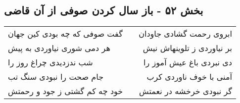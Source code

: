 \begin{center}
\section*{بخش ۵۲ - باز سال کردن صوفی از آن قاضی}
\label{sec:sh052}
\begin{longtable}{l p{0.5cm} r}
گفت صوفی که چه بودی کین جهان
&&
ابروی رحمت گشادی جاودان
\\
هر دمی شوری نیاوردی به پیش
&&
بر نیاوردی ز تلوینهاش نیش
\\
شب ندزدیدی چراغ روز را
&&
دی نبردی باغ عیش آموز را
\\
جام صحت را نبودی سنگ تب
&&
آمنی با خوف ناوردی کرب
\\
خود چه کم گشتی ز جود و رحمتش
&&
گر نبودی خرخشه در نعمتش
\\
\end{longtable}
\end{center}
